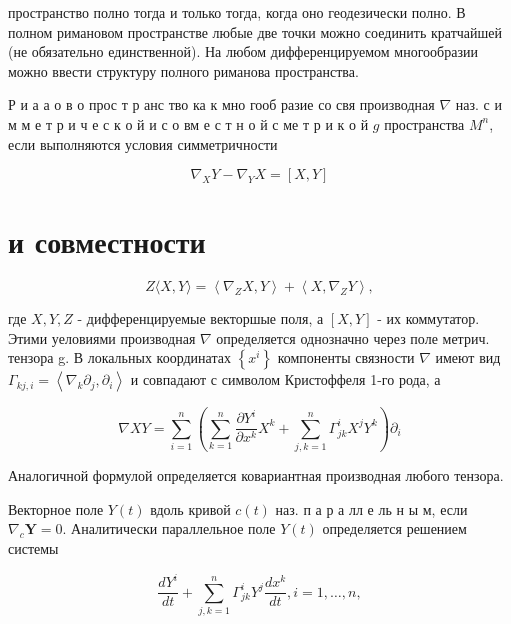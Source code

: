 \documentclass[10pt]{article}
\begin{document}
пространство полно тогда и только тогда, когда оно геодезически полно. В полном римановом пространстве любые две точки можно соединить кратчайшей (не обязательно единственной). На любом дифференцируемом многообразии можно ввести структуру полного риманова пространства.



Р и а а о в о прос т р анс тво ка к мно гооб разие со свя производная $\nabla$ наз. с и м м е т р и ч е с к о й и с о вм е с т н о й с ме т р и к о й $g$ пространства $M^{n}$, если выполняются условия симметричности



\[

\nabla_{X} Y-\nabla_{Y} X=[X, Y]

\]



\section{и совместности}

\[

Z\langle X, Y\rangle=\left\langle\nabla_{Z} X, Y\right\rangle+\left\langle X, \nabla_{Z} Y\right\rangle,

\]



где $X, Y, Z$ - дифференцируемые векторшые поля, а $[X, Y]$ - их коммутатор. Этими уеловиями производная $\nabla$ определяется однозначно через поле метрич. тензора g. В локальных координатах $\left\{x^{i}\right\}$ компоненты связности $\nabla$ имеют вид $\Gamma_{k j, i}=\left\langle\nabla_{k} \partial_{j}, \partial_{i}\right\rangle$ и совпадают с символом Кристоффеля 1-го рода, а



\[

\nabla X Y=\sum_{i=1}^{n}\left(\sum_{k=1}^{n} \frac{\partial Y^{i}}{\partial x^{k}} X^{k}+\sum_{j, k=1}^{n} \Gamma_{j k}^{i} X^{j} Y^{k}\right) \partial_{i}

\]



Аналогичной формулой определяется ковариантная производная любого тензора.



Векторное поле $Y(t)$ вдоль кривой $c(t)$ наз. п а р а лл е ль н ы м, если $\nabla_{c} \boldsymbol{Y}=0$. Аналитически параллельное поле $Y(t)$ определяется решением системы



\[

\frac{d Y^{i}}{d t}+\sum_{j, k=1}^{n} \Gamma_{j k}^{i} Y^{j} \frac{d x^{k}}{d t}, i=1, \ldots, n,

\]
\end{document}
